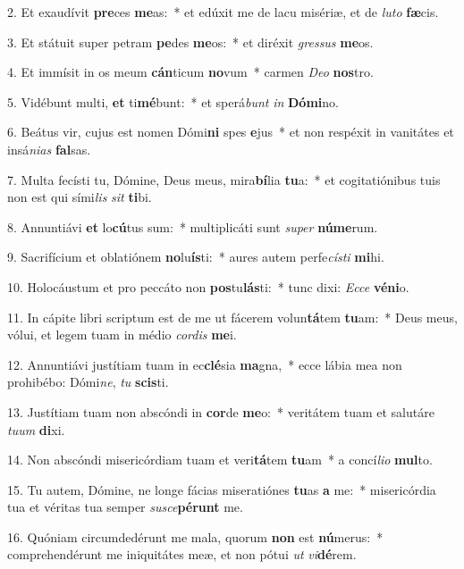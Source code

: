 2. Et exaudívit \textbf{pre}ces \textbf{me}as:~*  et edúxit me de lacu misériæ, et de \textit{lu}\textit{to} \textbf{fæ}cis.\

3. Et státuit super petram \textbf{pe}des \textbf{me}os:~*  et diréxit \textit{gres}\textit{sus} \textbf{me}os.\

4. Et immísit in os meum \textbf{cán}ticum \textbf{no}vum~*  carmen \textit{De}\textit{o} \textbf{nos}tro.\

5. Vidébunt multi, \textbf{et} ti\textbf{mé}bunt:~*  et sperá\textit{bunt} \textit{in} \textbf{Dó}\textbf{mi}no.\

6. Beátus vir, cujus est nomen Dómi\textbf{ni} spes \textbf{e}jus~*  et non respéxit in vanitátes et insá\textit{ni}\textit{as} \textbf{fal}sas.\

7. Multa fecísti tu, Dómine, Deus meus, mira\textbf{bí}lia \textbf{tu}a:~*  et cogitatiónibus tuis non est qui sími\textit{lis} \textit{sit} \textbf{ti}bi.\

8. Annuntiávi \textbf{et} lo\textbf{cú}tus sum:~*  multiplicáti sunt \textit{su}\textit{per} \textbf{nú}\textbf{me}rum.\

9. Sacrifícium et oblatiónem \textbf{no}lu\textbf{ís}ti:~*  aures autem perfe\textit{cís}\textit{ti} \textbf{mi}hi.\

10. Holocáustum et pro peccáto non \textbf{pos}tu\textbf{lás}ti:~*  tunc dixi: \textit{Ec}\textit{ce} \textbf{vé}\textbf{ni}o.\

11. In cápite libri scriptum est de me ut fácerem volun\textbf{tá}tem \textbf{tu}am:~*  Deus meus, vólui, et legem tuam in médio \textit{cor}\textit{dis} \textbf{me}i.\

12. Annuntiávi justítiam tuam in ec\textbf{clé}sia \textbf{ma}gna,~*  ecce lábia mea non prohibébo: Dómi\textit{ne}, \textit{tu} \textbf{scis}ti.\

13. Justítiam tuam non abscóndi in \textbf{cor}de \textbf{me}o:~*  veritátem tuam et salutáre \textit{tu}\textit{um} \textbf{di}xi.\

14. Non abscóndi misericórdiam tuam et veri\textbf{tá}tem \textbf{tu}am~*  a concí\textit{li}\textit{o} \textbf{mul}to.\

15. Tu autem, Dómine, ne longe fácias miseratiónes \textbf{tu}as \textbf{a} me:~*  misericórdia tua et véritas tua semper \textit{su}\textit{sce}\textbf{pé}\textbf{runt} me.\

16. Quóniam circumdedérunt me mala, quorum \textbf{non} est \textbf{nú}merus:~*  comprehendérunt me iniquitátes meæ, et non pótui \textit{ut} \textit{vi}\textbf{dé}rem.\

